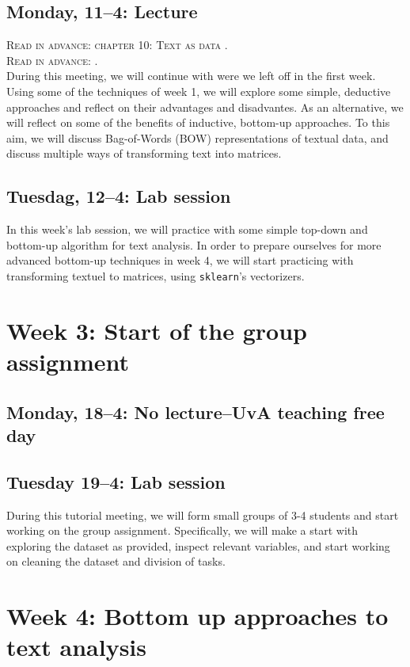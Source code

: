 \subsection*{Monday, 11--4: Lecture}
\textsc{Read in advance: chapter 10: Text as data \cite{van_atteveldt_computational_2022}.} \\
\textsc{Read in advance: \cite{Boumans2016}.} \\

During this meeting, we will continue with were we left off in the first week. Using some of the techniques of week 1, we will explore some simple, deductive approaches and reflect on their advantages and disadvantes. As an alternative, we will reflect on some of the benefits of inductive, bottom-up approaches. To this aim, we will discuss Bag-of-Words (BOW) representations of textual data, and discuss multiple ways of transforming text into matrices. 

\subsection*{Tuesdag, 12--4: Lab session}
In this week's lab session, we will practice with some simple top-down and bottom-up algorithm for text analysis. In order to prepare ourselves for more advanced bottom-up techniques in week 4, we will start practicing with transforming textuel to matrices, using  \texttt{sklearn}'s vectorizers. 

\section*{Week 3: Start of the group assignment}

\subsection*{Monday, 18--4: No lecture--UvA teaching free day}

\subsection*{Tuesday 19--4: Lab session}
During this tutorial meeting, we will form small groups of 3-4 students and start working on the group assignment. Specifically, we will make a start with exploring the dataset as provided, inspect relevant variables, and start working on cleaning the dataset and division of tasks. 

\section*{Week 4: Bottom up approaches to text analysis}

